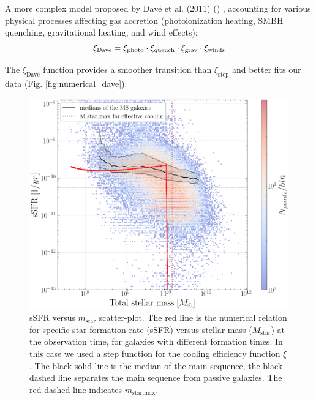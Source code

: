 \documentclass[fleqn,usenatbib]{mnras}
\begin{document}
A more complex model proposed by Davé et al. (2011) (\cite{dave_analytic_2012}) , accounting for various physical processes affecting gas accretion (photoionization heating, SMBH quenching, gravitational heating, and wind effects):
\begin{equation}
\xi_\text{Davé} = \xi_\text{photo} \cdot \xi_\text{quench} \cdot \xi_\text{grav} \cdot \xi_\text{winds}\\
\label{eq:xi_dave}
\end{equation}

The $\xi_\text{Davé}$ function provides a smoother transition than $\xi_\text{step}$ and better fits our data (Fig. \ref{fig:numerical_dave}).

\begin{figure}\centering
	\includegraphics[width=0.86\columnwidth]{images/sSFR_mass_Cantacode_csi_old_5-5.png}
    \caption{sSFR versus $m_\text{star}$ scatter-plot. The red line is the numerical relation for specific star formation rate (sSFR) versus stellar mass ($M_\text{star}$) at the observation time, for galaxies with different formation times. In this case we used a step function for the cooling efficiency function $\xi$.
    The black solid line is the median of the main sequence, the black dashed line separates the main sequence from passive galaxies. The red dashed line indicates $m_\text{star,max}$.}
    \label{fig:numerical_step}
\end{figure}
\end{document}
